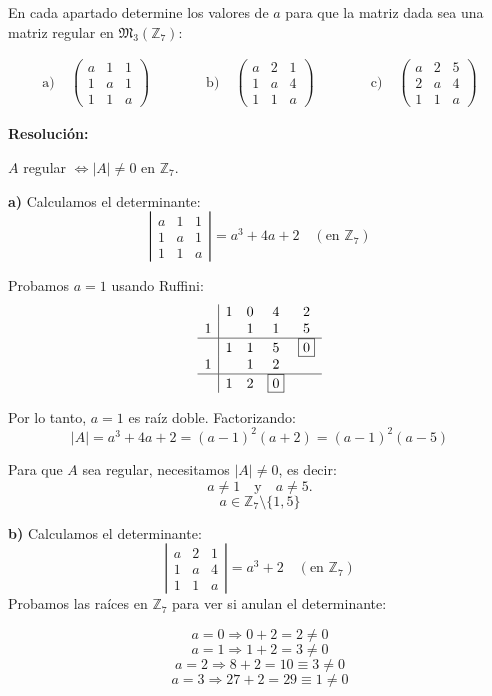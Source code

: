 \documentclass[a4paper,12pt]{article}
\begin{document}
\begin{ejercicio}[title=Ejercicio 16]
En cada apartado determine los valores de $a$ para que la matriz dada sea una matriz regular en $\mathfrak{M}_3(\mathbb{Z}_7)$:

\[
\begin{aligned}
\text{a)}\;&
\begin{pmatrix}
a & 1 & 1\\
1 & a & 1\\
1 & 1 & a
\end{pmatrix}
\qquad\qquad
\text{b)}\;&
\begin{pmatrix}
a & 2 & 1\\
1 & a & 4\\
1 & 1 & a
\end{pmatrix}
\qquad\qquad
\text{c)}\;&
\begin{pmatrix}
a & 2 & 5\\
2 & a & 4\\
1 & 1 & a
\end{pmatrix}
\end{aligned}
\]

\tcblower
\textbf{Resolución:}

$A$ regular $\Leftrightarrow |A| \neq 0$ en $\mathbb{Z}_7$.

\vspace{0.5em}

\textbf{a)}
Calculamos el determinante:
\[
\left|
\begin{matrix}
a & 1 & 1\\
1 & a & 1\\
1 & 1 & a
\end{matrix}
\right|
= a^3 + 4a + 2 \quad (\text{en } \mathbb{Z}_7)
\]

Probamos $a = 1$ usando Ruffini:
\[
\begin{array}{c|cccc}
  & 1 & 0 & 4 & 2 \\
1 &   & 1 & 1 & 5  \\
\hline
  & 1 & 1 & 5 & \boxed{0} \\
1 &   & 1 & 2 \\
\hline
  & 1 & 2 & \boxed{0}
\end{array}
\]

Por lo tanto, $a = 1$ es raíz doble. Factorizando:
\[
|A| = a^3 + 4a + 2 = (a - 1)^2 (a + 2) = (a - 1)^2 (a - 5)
\]

Para que $A$ sea regular, necesitamos $|A| \neq 0$, es decir:
\[
a \neq 1 \quad \text{y} \quad a \neq 5.
\]
\[
\boxed{a \in \mathbb{Z}_7 \setminus \{1,5\}}
\]

\textbf{b)}
Calculamos el determinante:
\[
\left|
\begin{matrix}
a & 2 & 1\\
1 & a & 4\\
1 & 1 & a
\end{matrix}
\right|
= a^3 + 2 \quad (\text{en } \mathbb{Z}_7)
\]
Probamos las raíces en $\mathbb{Z}_7$ para ver si anulan el determinante:

\[
a = 0 \Rightarrow 0 + 2 = 2 \neq 0
\]
\[
a = 1 \Rightarrow 1 + 2 = 3 \neq 0
\]
\[
a = 2 \Rightarrow 8 + 2 = 10 \equiv 3 \neq 0
\]
\[
a = 3 \Rightarrow 27 + 2 = 29 \equiv 1 \neq 0
\]
\end{ejercicio}
\end{document}
